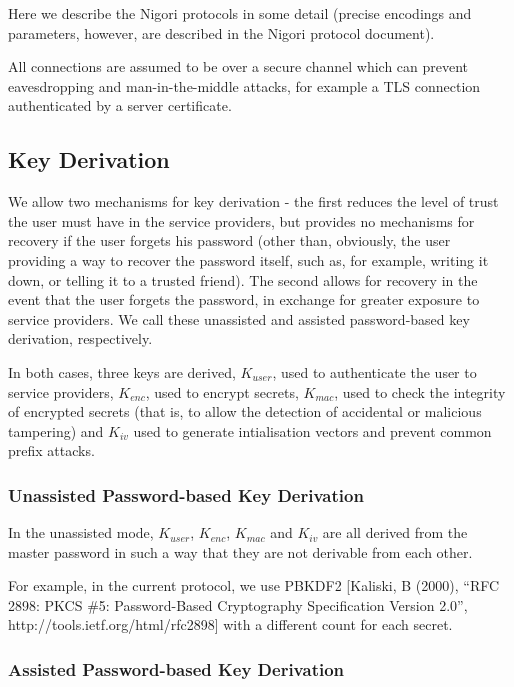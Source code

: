 \documentclass[a4paper,titlepage]{article}
\begin{document}
Here we describe the Nigori protocols in some detail (precise
encodings and parameters, however, are described in the Nigori
protocol document).

All connections are assumed to be over a secure channel which can
prevent eavesdropping and man-in-the-middle attacks, for example a TLS
connection authenticated by a server certificate.

\subsection{Key Derivation}

We allow two mechanisms for key derivation - the first reduces the
level of trust the user must have in the service providers, but
provides no mechanisms for recovery if the user forgets his password
(other than, obviously, the user providing a way to recover the
password itself, such as, for example, writing it down, or telling it
to a trusted friend). The second allows for recovery in the event that
the user forgets the password, in exchange for greater exposure to
service providers. We call these unassisted and assisted
password-based key derivation, respectively.

In both cases, three keys are derived, $K_{user}$, used to
authenticate the user to service providers, $K_{enc}$, used to encrypt
secrets, $K_{mac}$, used to check the integrity of encrypted
secrets (that is, to allow the detection of accidental or malicious
tampering) and $K_{iv}$ used to generate intialisation vectors and
prevent common prefix attacks.

\subsubsection{Unassisted Password-based Key Derivation}


In the unassisted mode, $K_{user}$, $K_{enc}$, $K_{mac}$ and $K_{iv}$ are all derived from the master password in such a way that they are not derivable from each other.

For example, in the current protocol, we use PBKDF2 [Kaliski, B
  (2000), ``RFC 2898: PKCS \#5: Password-Based Cryptography
  Specification Version 2.0'', http://tools.ietf.org/html/rfc2898]
with a different count for each secret.

\subsubsection{Assisted Password-based Key Derivation}
\end{document}
